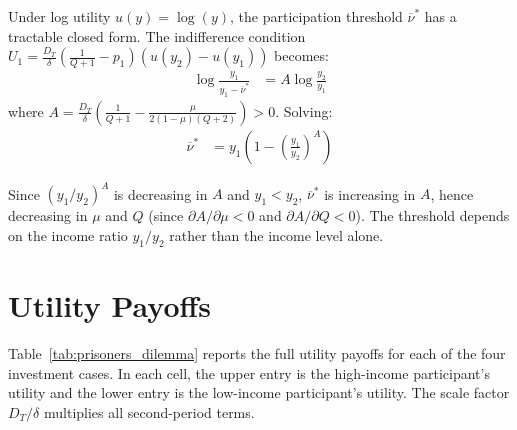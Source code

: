 \documentclass[
    oneside,
    fontsize=10pt,leqno]{article}
\begin{document}
Under log utility $u(y)=\log(y)$, the participation threshold
$\overline{\nu}^{*}$ has a tractable closed form. The indifference
condition $U_{1}=\frac{D_{T}}{\delta}\left(\frac{1}{Q+1}-p_{1}\right)(u(y_{2})-u(y_{1}))$
becomes:
\begin{align}
\log\frac{y_{1}}{y_{1}-\overline{\nu}^{*}} & =A\log\frac{y_{2}}{y_{1}}
\end{align}
where $A=\frac{D_{T}}{\delta}\left(\frac{1}{Q+1}-\frac{\mu}{2(1-\mu)(Q+2)}\right)>0$.
Solving:
\begin{align}
\overline{\nu}^{*} & =y_{1}\left(1-\left(\frac{y_{1}}{y_{2}}\right)^{A}\right)\label{eq:nu_star}
\end{align}

Since $(y_{1}/y_{2})^{A}$ is decreasing in $A$ and $y_{1}<y_{2}$,
$\overline{\nu}^{*}$ is increasing in $A$, hence decreasing in $\mu$
and $Q$ (since $\partial A/\partial\mu<0$ and $\partial A/\partial Q<0$).
The threshold depends on the income ratio $y_{1}/y_{2}$ rather than
the income level alone.

\section{Utility Payoffs} \label{sec:appendix_payoffs}

Table~\ref{tab:prisoners_dilemma} reports the full utility payoffs
for each of the four investment cases. In each cell, the upper entry
is the high-income participant's utility and the lower entry is the
low-income participant's utility. The scale factor $D_{T}/\delta$
multiplies all second-period terms.
\end{document}
